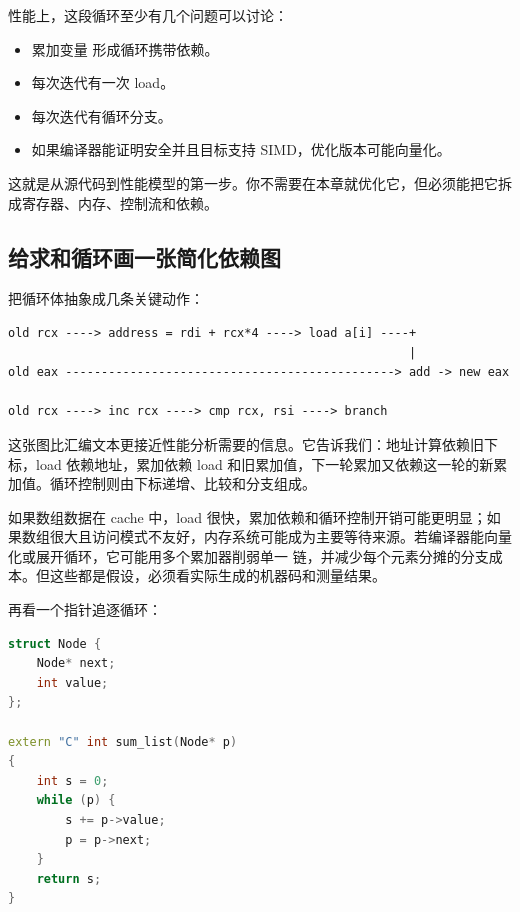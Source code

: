 性能上，这段循环至少有几个问题可以讨论：

\begin{itemize}
  \item 累加变量  形成循环携带依赖。
  \item 每次迭代有一次 load。
  \item 每次迭代有循环分支。
  \item 如果编译器能证明安全并且目标支持 SIMD，优化版本可能向量化。
\end{itemize}

这就是从源代码到性能模型的第一步。你不需要在本章就优化它，但必须能把它拆成寄存器、内存、控制流和依赖。

\subsection{给求和循环画一张简化依赖图}

把循环体抽象成几条关键动作：

\begin{center}
\begin{minipage}{0.86\linewidth}
\begin{verbatim}
old rcx ----> address = rdi + rcx*4 ----> load a[i] ----+
                                                        |
old eax ----------------------------------------------> add -> new eax

old rcx ----> inc rcx ----> cmp rcx, rsi ----> branch
\end{verbatim}
\end{minipage}
\end{center}

这张图比汇编文本更接近性能分析需要的信息。它告诉我们：地址计算依赖旧下标，load 依赖地址，累加依赖 load 和旧累加值，下一轮累加又依赖这一轮的新累加值。循环控制则由下标递增、比较和分支组成。

如果数组数据在 cache 中，load 很快，累加依赖和循环控制开销可能更明显；如果数组很大且访问模式不友好，内存系统可能成为主要等待来源。若编译器能向量化或展开循环，它可能用多个累加器削弱单一  链，并减少每个元素分摊的分支成本。但这些都是假设，必须看实际生成的机器码和测量结果。

再看一个指针追逐循环：

\begin{lstlisting}[language=C++]
struct Node {
    Node* next;
    int value;
};

extern "C" int sum_list(Node* p)
{
    int s = 0;
    while (p) {
        s += p->value;
        p = p->next;
    }
    return s;
}
\end{lstlisting}

